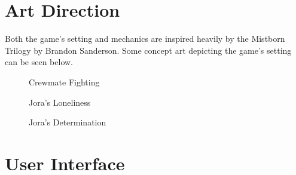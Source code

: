 \documentclass{article}
\begin{document}
\section{Art Direction}

Both the game's setting and mechanics are inspired heavily by the Mistborn Trilogy by Brandon Sanderson. Some concept art depicting the game's setting can be seen below.

\begin{figure}[!htb]
  \caption {Crewmate Fighting}
  \end{figure}

  \begin{figure}[!htb]
  \caption {Jora's Loneliness}
  \end{figure}

  \begin{figure}[!htb]
  \caption {Jora's Determination}
  \end{figure}

\section{User Interface}
\end{document}

